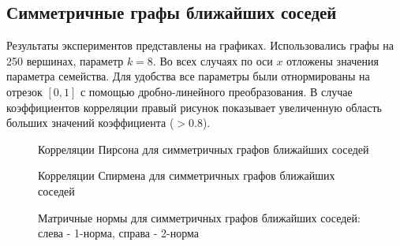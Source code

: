 \clearpage
\subsection{Симметричные графы ближайших соседей} \label{sect3_1_2}

Результаты экспериментов представлены на графиках. Использовались графы на 250 вершинах, параметр $k = 8$. 
Во всех случаях по оси $x$ отложены значения параметра семейства. Для удобства все параметры были отнормированы на отрезок $[0,1]$ с помощью дробно-линейного преобразования. В случае коэффициентов корреляции правый рисунок показывает увеличенную область больших значений коэффициента ($>0.8$).

\begin{figure}[h]
  \begin{minipage}[h]{0.49\linewidth}
  \end{minipage}
  \hfill
  \begin{minipage}[h]{0.49\linewidth}
  \end{minipage}

  \caption{Корреляции Пирсона для симметричных графов ближайших соседей}
  \label{img:sym_graphs}  
\end{figure}

\begin{figure}[h]
  \begin{minipage}[h]{0.49\linewidth}
  \end{minipage}
  \hfill
  \begin{minipage}[h]{0.49\linewidth}
  \end{minipage}

  \caption{Корреляции Спирмена для симметричных графов ближайших соседей}
  \label{img:sym_graphs_sp}  
\end{figure}


\begin{figure}[h]
  \begin{minipage}[h]{0.49\linewidth}
  \end{minipage}
  \hfill
  \begin{minipage}[h]{0.49\linewidth}
  \end{minipage}

  \caption{Матричные нормы для симметричных графов ближайших соседей: слева - 1-норма, справа - 2-норма}
  \label{img:sym_graphs_norm}  
\end{figure}

